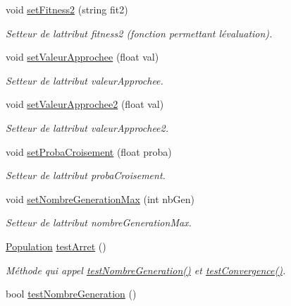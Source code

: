 \begin{DoxyCompactItemize}
void \hyperlink{class_population_af5940422c47c86ea6eb606224016d32d}{set\+Fitness2} (string fit2)
\begin{DoxyCompactList}\small\item\em Setteur de l\textquotesingle{}attribut fitness2 (fonction permettant l\textquotesingle{}évaluation). \end{DoxyCompactList}\item 
void \hyperlink{class_population_ad3e0a26ca7b57924bcbb7a57d86056e4}{set\+Valeur\+Approchee} (float val)
\begin{DoxyCompactList}\small\item\em Setteur de l\textquotesingle{}attribut valeur\+Approchee. \end{DoxyCompactList}\item 
void \hyperlink{class_population_aa5645305dfca65e640ed76da9f851137}{set\+Valeur\+Approchee2} (float val)
\begin{DoxyCompactList}\small\item\em Setteur de l\textquotesingle{}attribut valeur\+Approchee2. \end{DoxyCompactList}\item 
void \hyperlink{class_population_a175f3a21b85681e318063e9eb63550a8}{set\+Proba\+Croisement} (float proba)
\begin{DoxyCompactList}\small\item\em Setteur de l\textquotesingle{}attribut proba\+Croisement. \end{DoxyCompactList}\item 
void \hyperlink{class_population_a85da2cfbfb4cde5c3ed879958385904c}{set\+Nombre\+Generation\+Max} (int nb\+Gen)
\begin{DoxyCompactList}\small\item\em Setteur de l\textquotesingle{}attribut nombre\+Generation\+Max. \end{DoxyCompactList}\item 
\hyperlink{class_population}{Population} \hyperlink{class_population_afe14ed3d2919840291b623029eaaf8d3}{test\+Arret} ()
\begin{DoxyCompactList}\small\item\em Méthode qui appel \hyperlink{class_population_a9192297f35ab0c6c6078ae087b3e4aee}{test\+Nombre\+Generation()} et \hyperlink{class_population_ae3511322c007fc85a8dd9bda0693b9cf}{test\+Convergence()}. \end{DoxyCompactList}\item 
bool \hyperlink{class_population_a9192297f35ab0c6c6078ae087b3e4aee}{test\+Nombre\+Generation} ()

\end{DoxyCompactItemize}
